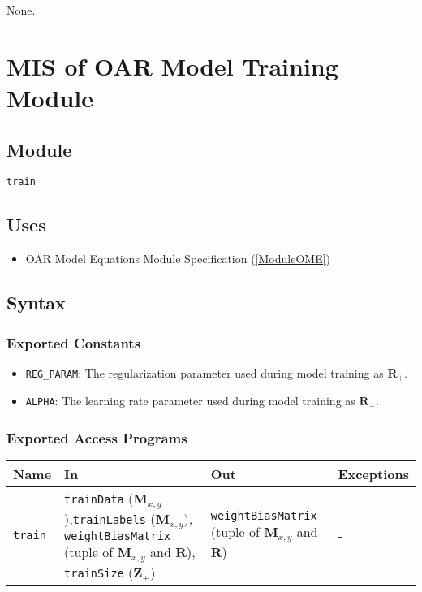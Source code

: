 \documentclass[12pt, titlepage]{article}
\def\code#1{\texttt{#1}}
\begin{document}
None.

\section{MIS of OAR Model Training Module} \label{ModuleOMTr} 

\subsection{Module}

\code{train}

\subsection{Uses}

\begin{itemize}
  \item OAR Model Equations Module Specification (\ref{ModuleOME})
\end{itemize}

\subsection{Syntax}

\subsubsection{Exported Constants}

\begin{itemize}
  \item \code{REG\_PARAM}: The regularization parameter used during model training as $\mathbf{R}_{+}$.
  \item \code{ALPHA}: The learning rate parameter used during model training as $\mathbf{R}_{+}$.
\end{itemize}

\subsubsection{Exported Access Programs}

\begin{center}
\begin{tabular}{p{2cm} p{4cm} p{4cm} p{2cm}}
\hline
\textbf{Name} & \textbf{In} & \textbf{Out} & \textbf{Exceptions} \\
\hline
\code{train} & \code{trainData} ($\mathbf{M}_{x,y}$),\code{trainLabels} ($\mathbf{M}_{x,y}$), \code{weightBiasMatrix} (tuple of $\mathbf{M}_{x,y}$ and $\mathbf{R}$), \code{trainSize} ($\mathbf{Z}_{+}$)& \code{weightBiasMatrix} (tuple of $\mathbf{M}_{x,y}$ and $\mathbf{R}$) & - \\
\hline
\end{tabular}
\end{center}
\end{document}
